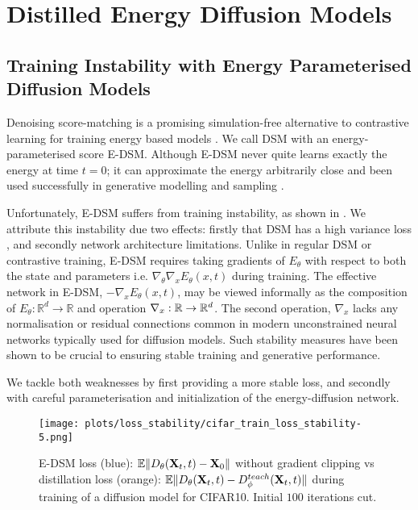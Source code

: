 

\newpage
\section{Distilled Energy Diffusion Models} \label{sec:training_methods}
\subsection{Training Instability with Energy Parameterised Diffusion Models}


Denoising score-matching \citep{vincent2011connection, song2019generative} is a promising simulation-free alternative to contrastive learning for training energy based models \citep{salimans2021should, song2021trainebm}. We call DSM with an energy-parameterised score E-DSM. Although E-DSM never quite learns exactly the energy at time $t=0$; it can approximate the energy arbitrarily close and been used successfully in generative modelling \citep{du2023reduce, salimans2021should} and sampling \citep{phillips2024particle}.

Unfortunately, E-DSM suffers from training instability, as shown in . We attribute this instability due two effects: firstly that DSM has a high variance loss \citep{jeha2024variance}, and secondly network architecture limitations. 
Unlike in regular DSM or contrastive training,  E-DSM requires taking gradients of $E_\theta$ with respect to both the state and parameters i.e. $\nabla_\theta\nabla_x E_\theta(x,t)$ during training. The effective network in E-DSM, $-\nabla_x E_\theta(x, t)$, may be viewed informally as the composition of $E_\theta: \mathbb{R}^d \rightarrow \mathbb{R}$ and operation $\nabla_x: \mathbb{\mathbb{R}} \rightarrow \mathbb{R}^d$. The second operation, $\nabla_x$ lacks any normalisation or residual connections common in modern unconstrained neural networks typically used for diffusion models. Such stability measures have been shown to be crucial \citep{Karras2024edm2, karras2022elucidating} to ensuring stable training and generative performance.

We tackle both weaknesses by first providing a more stable loss, and secondly with careful parameterisation and initialization of the energy-diffusion network.

\begin{figure}[H]
    \centering
        \texttt{[image: plots/loss\_stability/cifar\_train\_loss\_stability-5.png]}
    \caption{E-DSM loss (blue): $\mathbb{E}\|D_\theta(\mathbf{X}_t,t)- \mathbf{X}_0\|$ without gradient clipping vs distillation loss (orange): $\mathbb{E}\|D_\theta(\mathbf{X}_t,t)- D^{teach}_{\phi}(\mathbf{X}_{t},t)\|$ during training of a diffusion model for CIFAR10. Initial $100$ iterations cut.} 
    \label{fig:loss_stability}
\end{figure}


